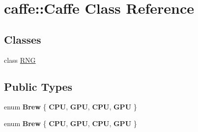 \hypertarget{classcaffe_1_1_caffe}{}\section{caffe\+:\+:Caffe Class Reference}
\label{classcaffe_1_1_caffe}
\subsection*{Classes}
\begin{DoxyCompactItemize}
\item 
class \mbox{\hyperlink{classcaffe_1_1_caffe_1_1_r_n_g}{R\+NG}}
\end{DoxyCompactItemize}
\subsection*{Public Types}
\begin{DoxyCompactItemize}
\item 
\mbox{\label{classcaffe_1_1_caffe_af8f607248c1f212be1f6f1c988d80e4e}} 
enum {\bfseries Brew} \{ {\bfseries C\+PU}, 
{\bfseries G\+PU}, 
{\bfseries C\+PU}, 
{\bfseries G\+PU}
 \}
\item 
\mbox{\label{classcaffe_1_1_caffe_af8f607248c1f212be1f6f1c988d80e4e}} 
enum {\bfseries Brew} \{ {\bfseries C\+PU}, 
{\bfseries G\+PU}, 
{\bfseries C\+PU}, 
{\bfseries G\+PU}
 \}
\end{DoxyCompactItemize}
